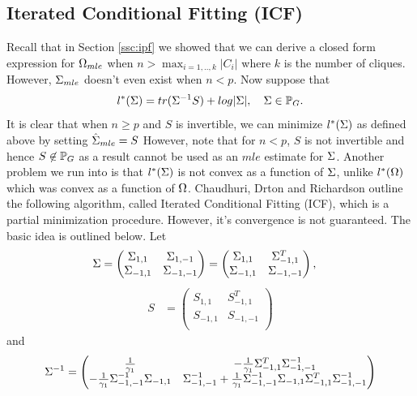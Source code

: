 \documentclass[12pt, leqno]{article}
\providecommand{\abs}[1]{\lvert#1\rvert}
\let\oldhat\hat
\renewcommand{\hat}[1]{\oldhat{{#1}}}
\def\s{\ensuremath\Sigma}
\def\om{\ensuremath\Omega}
\def\pg{\ensuremath\mathbb{P}_{{G}}}
\begin{document}
\subsection{Iterated Conditional Fitting (ICF)}
Recall that in Section \ref{ssc:ipf} we showed that we can derive a
closed form expression for $\om_{mle}$ when $n>
\max_{i=1,..,k} \abs{C_i}$ where $k$ is the number of
cliques. However, $\s_{mle}$ doesn't even exist when $n<p$. 
Now suppose that
\[
l^*(\s) = tr(\s^{-1} S) + log \abs{\s}, \quad \s \in \pg.
\]  
It is clear that when $n \geq p$ and $S$ is invertible, we can minimize $l^*(\s)$ as defined
above by setting $\hat{\s}_{mle} = S$ However, note that for $n <p$,
$S$ is not invertible and hence $S \not\in \pg$ as a result cannot be
used as an $mle$ estimate for $\s$. Another problem we run into is
that $l^*(\s)$ is not convex as a function of $\s$, unlike $l^*(\om)$
which was convex as a function of $\om$. Chaudhuri, Drton and
Richardson outline the following algorithm, called Iterated
Conditional Fitting (ICF), which is a partial minimization
procedure. However, it's convergence is not guaranteed. The basic idea
is outlined below. Let 
\begin{align*}
\s &= \begin{pmatrix} \s_{1,1} & \s_{1,-1} \\
\s_{-1,1} & \s_{-1,-1} \\
\end{pmatrix} = \begin{pmatrix} \s_{1,1} & \s_{-1,1}^T \\
\s_{-1,1} & \s_{-1,-1} \\
\end{pmatrix}, 
\end{align*}
\begin{align*}
S &= \begin{pmatrix} S_{1,1} & S_{-1,1}^T \\
S_{-1,1} & S_{-1,-1} \\
\end{pmatrix} 
\end{align*}
and 
\begin{align*}
\s^{-1} = \begin{pmatrix} \frac{1}{\gamma_1} & -\frac{1}{\gamma_1}
  \s_{-1,1}^T \s_{-1,-1}^{-1} \\
-\frac{1}{\gamma_1} \s_{-1,-1}^{-1} \s_{-1,1} &
\s_{-1,-1}^{-1} + \frac{1}{\gamma_1} \s_{-1,-1}^{-1}
\s_{-1,1}\s_{-1,1}^T\s_{-1,-1}^{-1} 
\end{pmatrix}
\end{align*}
\end{document}
